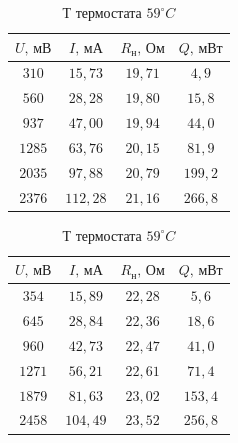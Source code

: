 \documentclass[a4paper,12pt]{article}
\begin{document}
         \begin{table}[!ht]
    \begin{minipage}{0.48\linewidth}
        \centering
        \begin{tabular}{|c|c|c|c|}
            \hline
            $U, \, \text{мВ}$ & $I, \, \text{мА}$ & $R_н, \, \text{Ом}$ & $Q, \, \text{мВт}$\\ \hline
            $310$ & $15,73$ & $19,71$ & $4,9$ \\ \hline
            $560$ & $28,28$ & $19,80$ & $15,8$ \\ \hline
            $937$ & $47,00$ & $19,94$ & $44,0$ \\ \hline
            $1285$ & $63,76$ & $20,15$ & $81,9$ \\ \hline
            $2035$ & $97,88$ & $20,79$ & $199,2$ \\ \hline
            $2376$ & $112,28$ & $21,16$ & $266,8$ \\ \hline
           
        \end{tabular}
        \caption{Т термостата $23^\circ C$}
        \label{table_61}
    \end{minipage}
    \hspace{0.04\linewidth} %
    \begin{minipage}{0.4\linewidth}
        \centering
        \begin{tabular}{|c|c|c|c|}
            \hline
            $U, \, \text{мВ}$ & $I, \, \text{мА}$ & $R_н, \, \text{Ом}$ & $Q, \, \text{мВт}$\\ \hline
            $354$ & $15,89$ & $22,28$ & $5,6$ \\ \hline
            $645$ & $28,84$ & $22,36$ & $18,6$ \\ \hline
            $960$ & $42,73$ & $22,47$ & $41,0$ \\ \hline
            $1271$ & $56,21$ & $22,61$ & $71,4$ \\ \hline
            $1879$ & $81,63$ & $23,02$ & $153,4$ \\ \hline
            $2458$ & $104,49$ & $23,52$ & $256,8$ \\ \hline
        \end{tabular}
        \caption{Т термостата $59 ^\circ C$}
        \label{table_80}
    \end{minipage}
\end{table}
\end{document}
